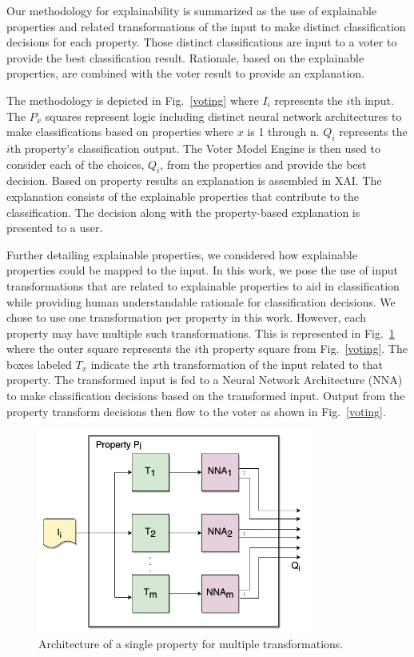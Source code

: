 \documentclass[conference]{IEEEtran}
\begin{document}
Our methodology for explainability is summarized as the use of explainable properties and related transformations of the input to make distinct classification decisions for each property.  Those distinct classifications are input to a voter to provide the best classification result.  Rationale, based on the explainable properties, are combined with the voter result to provide an explanation. 

The methodology is depicted in Fig.~\ref{voting} where $I_i$ represents the $i$th input.  The $P_x$ squares represent logic including distinct neural network architectures to make classifications based on properties where $x$ is 1 through n.   $Q_i$ represents the $i$th property's classification output.  The Voter Model Engine is then used to consider each of the choices, $Q_i$, from the properties and provide the best decision.  Based on property results an explanation is assembled in XAI.   The explanation consists of the explainable properties that contribute to the classification.   The decision along with the property-based explanation is presented to a user.

Further detailing explainable properties, we considered how explainable properties could be mapped to the input.  In this work, we pose the use of input transformations that are related to explainable properties to aid in classification while providing human understandable rationale for classification decisions.  We chose to use one transformation per property in this work.  However, each property may have multiple such transformations.  This is represented in Fig.~\ref{proptrans} where the outer square represents the $i$th property square from Fig.~\ref{voting}.  The boxes labeled $T_x$ indicate the $x$th transformation of the input related to that property.  The transformed input is fed to a Neural Network Architecture (NNA) to make classification decisions based on the transformed input.  Output from the property transform decisions then flow to the voter as shown in Fig.~\ref{voting}.

 \begin{figure}[htbp]
\centerline{\includegraphics[width=90mm]{./images/property_transforms.png}}
\caption{Architecture of a single property for multiple transformations.}
\label{proptrans}
\end{figure}
\end{document}

